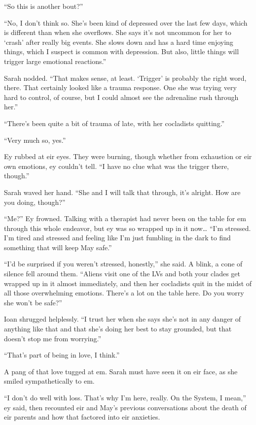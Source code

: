 ``So this is another bout?''

``No, I don't think so. She's been kind of depressed over the last few days, which is different than when she overflows. She says it's not uncommon for her to `crash' after really big events. She slows down and has a hard time enjoying things, which I suspect is common with depression. But also, little things will trigger large emotional reactions.''

Sarah nodded. ``That makes sense, at least. `Trigger' is probably the right word, there. That certainly looked like a trauma response. One she was trying very hard to control, of course, but I could almost see the adrenaline rush through her.''

``There's been quite a bit of trauma of late, with her cocladists quitting.''

``Very much so, yes.''

Ey rubbed at eir eyes. They were burning, though whether from exhaustion or eir own emotions, ey couldn't tell. ``I have no clue what was the trigger there, though.''

Sarah waved her hand. ``She and I will talk that through, it's alright. How are you doing, though?''

``Me?'' Ey frowned. Talking with a therapist had never been on the table for em through this whole endeavor, but ey was so wrapped up in it now\ldots{} ``I'm stressed. I'm tired and stressed and feeling like I'm just fumbling in the dark to find something that will keep May safe.''

``I'd be surprised if you weren't stressed, honestly,'' she said. A blink, a cone of silence fell around them. ``Aliens visit one of the LVs and both your clades get wrapped up in it almost immediately, and then her cocladists quit in the midst of all those overwhelming emotions. There's a lot on the table here. Do you worry she won't be safe?''

Ioan shrugged helplessly. ``I trust her when she says she's not in any danger of anything like that and that she's doing her best to stay grounded, but that doesn't stop me from worrying.''

``That's part of being in love, I think.''

A pang of that love tugged at em. Sarah must have seen it on eir face, as she smiled sympathetically to em.

``I don't do well with loss. That's why I'm here, really. On the System, I mean,'' ey said, then recounted eir and May's previous conversations about the death of eir parents and how that factored into eir anxieties.

